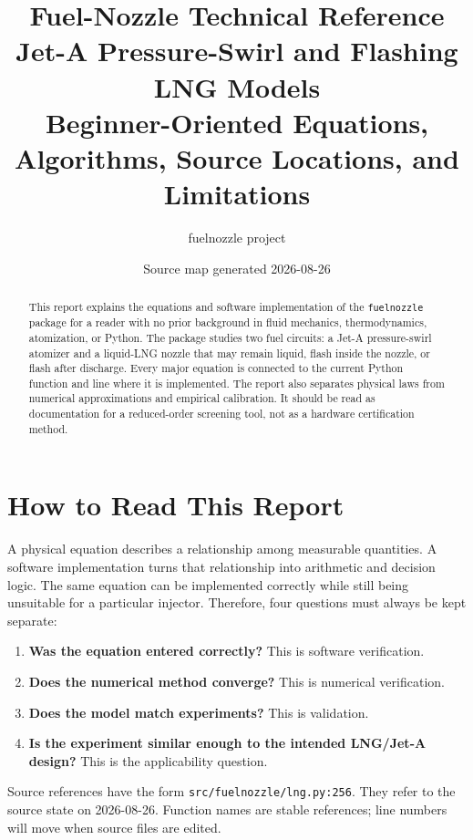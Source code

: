 \documentclass[11pt]{article}
\title{Fuel-Nozzle Technical Reference\\
\large Jet-A Pressure-Swirl and Flashing LNG Models\\
\large Beginner-Oriented Equations, Algorithms, Source Locations, and Limitations}
\author{fuelnozzle project}
\date{Source map generated 2026-08-26}
\newcommand{\code}[1]{\nolinkurl{#1}}
\newcommand{\srcline}[2]{\nolinkurl{#1:#2}}
\begin{document}
\maketitle

\begin{abstract}
This report explains the equations and software implementation of the
\code{fuelnozzle} package for a reader with no prior background in fluid mechanics,
thermodynamics, atomization, or Python. The package studies two fuel circuits:
a Jet-A pressure-swirl atomizer and a liquid-LNG nozzle that may remain liquid,
flash inside the nozzle, or flash after discharge. Every major equation is connected
to the current Python function and line where it is implemented. The report also
separates physical laws from numerical approximations and empirical calibration.
It should be read as documentation for a reduced-order screening tool, not as a
hardware certification method.
\end{abstract}

\tableofcontents
\newpage

\section{How to Read This Report}

A physical equation describes a relationship among measurable quantities. A
software implementation turns that relationship into arithmetic and decision logic.
The same equation can be implemented correctly while still being unsuitable for a
particular injector. Therefore, four questions must always be kept separate:

\begin{enumerate}[label=\arabic*.]
  \item \textbf{Was the equation entered correctly?} This is software verification.
  \item \textbf{Does the numerical method converge?} This is numerical verification.
  \item \textbf{Does the model match experiments?} This is validation.
  \item \textbf{Is the experiment similar enough to the intended LNG/Jet-A design?}
        This is the applicability question.
\end{enumerate}

Source references have the form \srcline{src/fuelnozzle/lng.py}{256}. They refer to
the source state on 2026-08-26. Function names are stable references; line numbers
will move when source files are edited.
\end{document}
